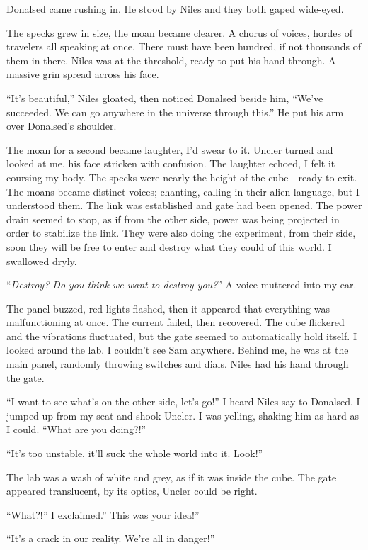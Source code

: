 \documentclass[
]{article}
\begin{document}
Donalsed came rushing in. He stood by Niles and they both gaped
wide-eyed.

The specks grew in size, the moan became clearer. A chorus of voices,
hordes of travelers all speaking at once. There must have been hundred,
if not thousands of them in there. Niles was at the threshold, ready to
put his hand through. A massive grin spread across his face.

``It's beautiful,'' Niles gloated, then noticed Donalsed beside him,
``We've succeeded. We can go anywhere in the universe through this.'' He
put his arm over Donalsed's shoulder.

The moan for a second became laughter, I'd swear to it. Uncler turned
and looked at me, his face stricken with confusion. The laughter echoed,
I felt it coursing my body. The specks were nearly the height of the
cube---ready to exit. The moans became distinct voices; chanting,
calling in their alien language, but I understood them. The link was
established and gate had been opened. The power drain seemed to stop, as
if from the other side, power was being projected in order to stabilize
the link. They were also doing the experiment, from their side, soon
they will be free to enter and destroy what they could of this world. I
swallowed dryly.

``\emph{Destroy? Do you think we want to destroy you?}'' A voice
muttered into my ear.

The panel buzzed, red lights flashed, then it appeared that everything
was malfunctioning at once. The current failed, then recovered. The cube
flickered and the vibrations fluctuated, but the gate seemed to
automatically hold itself. I looked around the lab. I couldn't see Sam
anywhere. Behind me, he was at the main panel, randomly throwing
switches and dials. Niles had his hand through the gate.

``I want to see what's on the other side, let's go!'' I heard Niles say
to Donalsed. I jumped up from my seat and shook Uncler. I was yelling,
shaking him as hard as I could. ``What are you doing?!''

``It's too unstable, it'll suck the whole world into it. Look!''

The lab was a wash of white and grey, as if it was inside the cube. The
gate appeared translucent, by its optics, Uncler could be right.

``What?!'' I exclaimed.'' This was your idea!''

``It's a crack in our reality. We're all in danger!''
\end{document}
